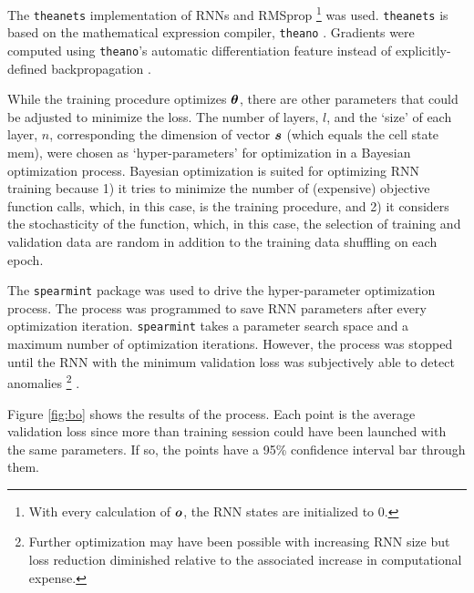 
The \texttt{theanets} \cite{Johnson2015} implementation of RNNs and RMSprop
\footnote{With every calculation of $\boldsymbol{o}$, the RNN states are initialized to 0.}
was used.
%
\texttt{theanets} is based on the mathematical expression compiler, \texttt{theano} \cite{Bergstra2010}.
%
Gradients were computed using \texttt{theano}'s automatic differentiation feature instead of explicitly-defined backpropagation \cite{Rumelhart1986}.


While the training procedure optimizes $\boldsymbol{\theta}$, there are other parameters that could be adjusted to minimize the loss.
%
The number of layers, $l$, and the `size' of each layer, $n$, corresponding the dimension of vector $\boldsymbol{s}$ (which equals the cell state mem), were chosen as `hyper-parameters' for optimization in a Bayesian optimization process.
%
Bayesian optimization is suited for optimizing RNN training because
1) it tries to minimize the number of (expensive) objective function calls, which, in this case, is the training procedure, and
2) it considers the stochasticity of the function, which, in this case, the selection of training and validation data are random in addition to the training data shuffling on each epoch.


The \texttt{spearmint} \cite{snoek2012practical} package was used to drive the hyper-parameter optimization process.
%
The process was programmed to save RNN parameters after every optimization iteration.
%
\texttt{spearmint} takes a parameter search space and a maximum number of optimization iterations.
%
However, the process was stopped until the RNN with the minimum validation loss was subjectively able to detect anomalies
%
\footnote{
Further optimization may have been possible with increasing RNN size but loss reduction diminished relative to the associated increase in computational expense.
}
.


Figure \ref{fig:bo} shows the results of the process.
%
Each point is the average validation loss since more than training session could have been launched with the same parameters.
%
If so, the points have a 95\% confidence interval bar through them.

